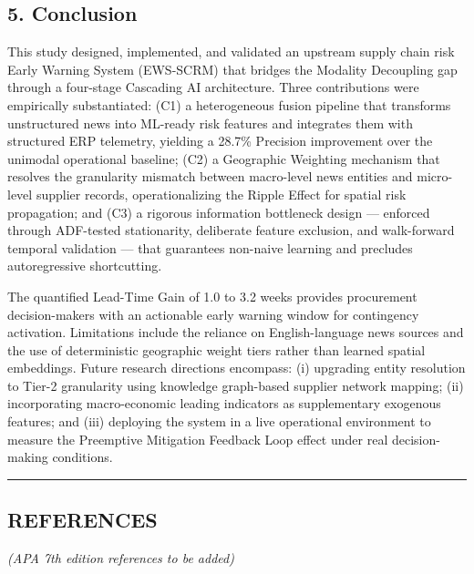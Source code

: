 \documentclass[conference]{IEEEtran}
\begin{document}
\subsection{5. Conclusion}\label{conclusion}

This study designed, implemented, and validated an upstream supply chain
risk Early Warning System (EWS-SCRM) that bridges the Modality
Decoupling gap through a four-stage Cascading AI architecture. Three
contributions were empirically substantiated: (C1) a heterogeneous
fusion pipeline that transforms unstructured news into ML-ready risk
features and integrates them with structured ERP telemetry, yielding a
28.7\% Precision improvement over the unimodal operational baseline;
(C2) a Geographic Weighting mechanism that resolves the granularity
mismatch between macro-level news entities and micro-level supplier
records, operationalizing the Ripple Effect for spatial risk
propagation; and (C3) a rigorous information bottleneck design ---
enforced through ADF-tested stationarity, deliberate feature exclusion,
and walk-forward temporal validation --- that guarantees non-naive
learning and precludes autoregressive shortcutting.

The quantified Lead-Time Gain of 1.0 to 3.2 weeks provides procurement
decision-makers with an actionable early warning window for contingency
activation. Limitations include the reliance on English-language news
sources and the use of deterministic geographic weight tiers rather than
learned spatial embeddings. Future research directions encompass: (i)
upgrading entity resolution to Tier-2 granularity using knowledge
graph-based supplier network mapping; (ii) incorporating macro-economic
leading indicators as supplementary exogenous features; and (iii)
deploying the system in a live operational environment to measure the
Preemptive Mitigation Feedback Loop effect under real decision-making
conditions.

\begin{center}\rule{0.5\linewidth}{0.5pt}\end{center}

\subsection{REFERENCES}\label{references}

\emph{(APA 7th edition references to be added)}
\end{document}
